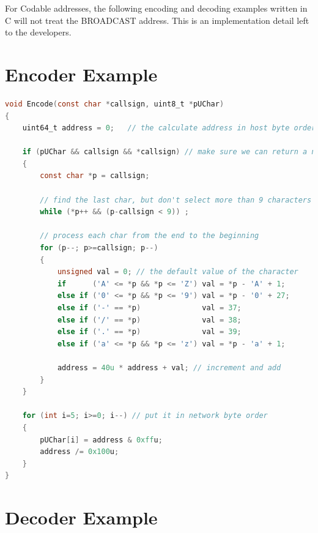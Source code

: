 \documentclass[a4paper,11pt,oneside]{book}
\begin{document}
For Codable addresses, the following encoding and decoding examples written in C will not treat the BROADCAST address. This is an implementation detail left to the developers.

\pagebreak

\section{Encoder Example}

\begin{lstlisting}[language=C,numbers=none]
void Encode(const char *callsign, uint8_t *pUChar)
{
	uint64_t address = 0;	// the calculate address in host byte order

	if (pUChar && callsign && *callsign) // make sure we can return a non-zero address
	{
		const char *p = callsign;

		// find the last char, but don't select more than 9 characters
		while (*p++ && (p-callsign < 9)) ;

		// process each char from the end to the beginning
		for (p--; p>=callsign; p--)
		{
			unsigned val = 0; // the default value of the character
			if      ('A' <= *p && *p <= 'Z') val = *p - 'A' + 1;
			else if ('0' <= *p && *p <= '9') val = *p - '0' + 27;
			else if ('-' == *p)              val = 37;
			else if ('/' == *p)              val = 38;
			else if ('.' == *p)              val = 39;
			else if ('a' <= *p && *p <= 'z') val = *p - 'a' + 1;

			address = 40u * address + val; // increment and add
		}
	}

	for (int i=5; i>=0; i--) // put it in network byte order
	{
		pUChar[i] = address & 0xffu;
		address /= 0x100u;
	}
}
\end{lstlisting}

\pagebreak

\section{Decoder Example}
\end{document}
